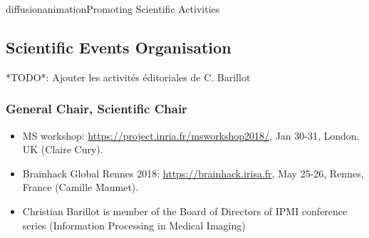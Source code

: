\documentclass{ra2018}
\begin{document}
\begin{module}{diffusion}{animation}{Promoting Scientific Activities}



\subsection{Scientific Events Organisation}

*TODO*: Ajouter les activités éditoriales de C. Barillot 

    \subsubsection{General Chair, Scientific Chair}
    \begin{itemize}
        \item MS workshop: \url{https://project.inria.fr/msworkshop2018/}, Jan 30-31, London, UK (Claire Cury).
        \item Brainhack Global Rennes 2018: \url{https://brainhack.irisa.fr}, May 25-26, Rennes, France (Camille Maumet).
         \item Christian Barillot is member of the Board of Directors of IPMI conference series (Information Processing in Medical Imaging)
        
    \end{itemize}    
    


\end{module}
\end{document}
